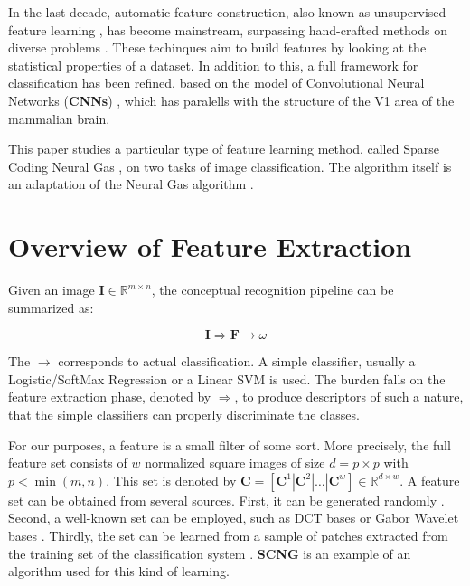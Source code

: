 \documentclass[runningheads,a4paper]{llncs}
\newcommand{\hctimes}[2]{{#1}\!\times\!{#2}}
\begin{document}
In the last decade, automatic feature construction, also known as unsupervised feature learning \cite{best-architecture-object-recognition,emergence-sparse-coding,sparse-coding-strategy-V1,tiny-images}, has become mainstream, surpassing hand-crafted methods on diverse problems \cite{best-architecture-object-recognition,learning-convolutional-feature-hierarchies,gradient-based-learning,convolutional-networks-vision,best-practices-cnn,simple-method-sparse-coding,sparse-features-audio-classification}. These techinques aim to build features by looking at the statistical properties of a dataset. In addition to this, a full framework for classification has been refined, based on the model of Convolutional Neural Networks (\textbf{CNNs}) \cite{gradient-based-learning}, which has paralells with the structure of the V1 area of the mammalian brain.

This paper studies a particular type of feature learning method, called Sparse Coding Neural Gas \cite{sparse-coding-neural-gas-1,sparse-coding-neural-gas-2,sparse-coding-neural-gas-3,sparse-coding-neural-gas-4}, on two tasks of image classification. The algorithm itself is an adaptation of the Neural Gas algorithm \cite{neural-gas-1,neural-gas-2}.

\section{Overview of Feature Extraction}

Given an image $\textbf{I} \in \mathbb{R}^{\hctimes{m}{n}}$, the conceptual recognition pipeline can be summarized as:

\begin{equation}
\textbf{I} \Rightarrow \textbf{F} \rightarrow \omega
\end{equation}

The $\rightarrow$ corresponds to actual classification. A simple classifier, usually a Logistic/SoftMax Regression or a Linear SVM is used. The burden falls on the feature extraction phase, denoted by $\Rightarrow$, to produce descriptors of such a nature, that the simple classifiers can properly discriminate the classes.

For our purposes, a feature is a small filter of some sort. More precisely, the full feature set consists of $w$ normalized square images of size $d = \hctimes{p}{p}$ with $p < \min(m,n)$. This set is denoted by $\textbf{C} = \left[ \textbf{C}^1 \left|\right. \textbf{C}^2 \left|\right. \dots \left|\right. \textbf{C}^w \right] \in \mathbb{R}^{\hctimes{d}{w}}$. A feature set can be obtained from several sources. First, it can be generated randomly \cite{random-weights-feature-learning}. Second, a well-known set can be employed, such as DCT bases or Gabor Wavelet bases \cite{simple-method-sparse-coding}. Thirdly, the set can be learned from a sample of patches extracted from the training set of the classification system \cite{emergence-sparse-coding,sparse-coding-strategy-V1,tiny-images}. \textbf{SCNG} is an example of an algorithm used for this kind of learning.
\end{document}
